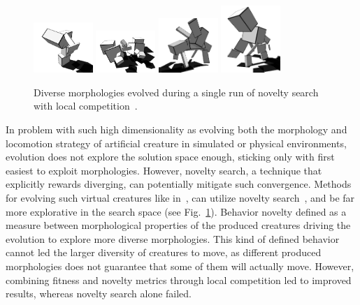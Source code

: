 \begin{figure}[t!]
\centering
\includegraphics[width=0.2\textwidth]{../Figures/Misc/nov1.png}
\includegraphics[width=0.2\textwidth]{../Figures/Misc/nov2.png}
\includegraphics[width=0.2\textwidth]{../Figures/Misc/nov3.png}
\includegraphics[width=0.2\textwidth]{../Figures/Misc/nov4.png}
\caption{Diverse morphologies evolved during a single run of novelty search with local competition~\citep{lehman2011evolving}.}
\label{fig:noveltySims}
\end{figure}

In problem with such high dimensionality as evolving both the morphology and locomotion strategy of artificial creature in simulated or physical environments, evolution does not explore the solution space enough, sticking only with first easiest to exploit morphologies. However, novelty search, a technique that explicitly rewards diverging, can potentially mitigate such convergence. Methods for evolving such virtual creatures like in~\citep{sims1994evolving}, can utilize novelty search~\citep{lehman2011evolving}, and be far more explorative in the search space (see Fig.~\ref{fig:noveltySims}). Behavior novelty defined as a measure between morphological properties of the produced creatures driving the evolution to explore more diverse morphologies. This kind of defined behavior cannot led the larger diversity of creatures to move, as different produced morphologies does not guarantee that some of them will actually move. However, combining fitness and novelty metrics through local competition led to improved results, whereas novelty search alone failed. 



